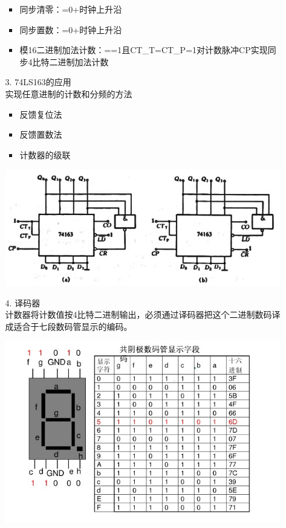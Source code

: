 \documentclass[UTF8]{ctexart}
\begin{document}
\begin{enumerate}
\begin{itemize}
                    \begin{itemize}
                        \item 同步清零：=0+时钟上升沿
                        \item 同步置数：=0+时钟上升沿
                        \item 模16二进制加法计数：==1且CT_T=CT_P=1对计数脉冲CP实现同步4比特二进制加法计数
                    \end{itemize}
              \item [3.] 74LS163的应用                  \\
                    实现任意进制的计数和分频的方法\\
                    \begin{itemize}
                        \item 反馈复位法
                        \item 反馈置数法
                        \item 计数器的级联
                    \end{itemize}
                    \begin{center}
                        \includegraphics[scale = 0.6]{3.png}
                    \end{center}
              \item [4.] 译码器\\
                    计数器将计数值按4比特二进制输出，必须通过译码器把这个二进制数码译成适合于七段数码管显示的编码。\\
                    \begin{center}
                        \includegraphics[scale = 0.6]{4.png}

\end{center}
\end{itemize}
\end{enumerate}
\end{document}
